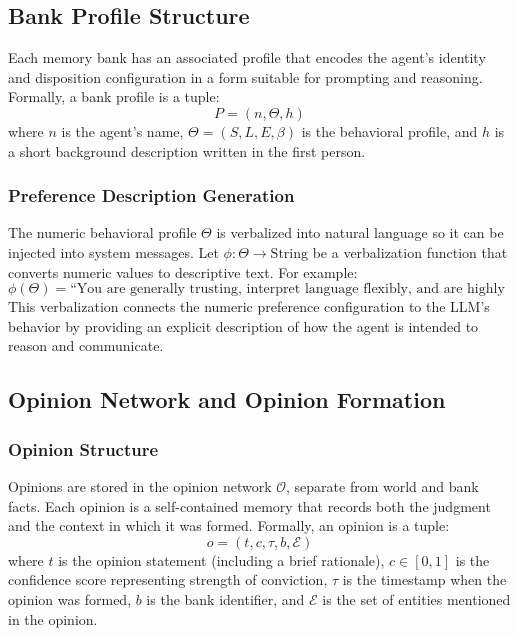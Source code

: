 \subsection{Bank Profile Structure}

Each memory bank has an associated profile that encodes the agent's identity and disposition configuration in a form suitable for prompting and reasoning. Formally, a bank profile is a tuple:
\begin{equation}
P = (n, \Theta, h)
\end{equation}
where $n$ is the agent's name, $\Theta = (S, L, E, \beta)$ is the behavioral profile, and $h$ is a short background description written in the first person.

\subsubsection{Preference Description Generation}

The numeric behavioral profile $\Theta$ is verbalized into natural language so it can be injected into system messages. Let $\phi: \Theta \rightarrow \text{String}$ be a verbalization function that converts numeric values to descriptive text. For example:
\begin{equation}
\phi(\Theta) = \text{``You are generally trusting, interpret language flexibly, and are highly empathetic ..."}
\end{equation}
This verbalization connects the numeric preference configuration to the LLM's behavior by providing an explicit description of how the agent is intended to reason and communicate.

\subsection{Opinion Network and Opinion Formation}

\subsubsection{Opinion Structure}

Opinions are stored in the opinion network $\mathcal{O}$, separate from world and bank facts. Each opinion is a self-contained memory that records both the judgment and the context in which it was formed. Formally, an opinion is a tuple:
\begin{equation}
o = (t, c, \tau, b, \mathcal{E})
\end{equation}
where $t$ is the opinion statement (including a brief rationale), $c \in [0,1]$ is the confidence score representing strength of conviction, $\tau$ is the timestamp when the opinion was formed, $b$ is the bank identifier, and $\mathcal{E}$ is the set of entities mentioned in the opinion.

